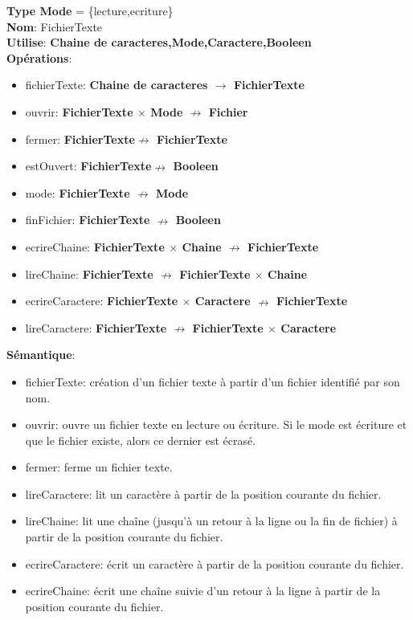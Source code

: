 \documentclass{article}
\begin{document}
    \noindent
    \textbf{Type Mode} = \{lecture,ecriture\} \\
    \textbf{Nom}: FichierTexte \\
    \textbf{Utilise}: \textbf{Chaine de caracteres,Mode,Caractere,Booleen} \\
    \textbf{Opérations}: \begin{itemize}[label=$\ $, leftmargin=2cm, itemsep=0cm]
        \item fichierTexte: \textbf{Chaine de caracteres $\rightarrow $ FichierTexte}
        \item ouvrir: \textbf{FichierTexte $ \times $ Mode $ \nrightarrow$ Fichier}
        \item fermer: \textbf{FichierTexte$  \nrightarrow $ FichierTexte}
        \item estOuvert: \textbf{FichierTexte$ \nrightarrow$  Booleen}
        \item mode: \textbf{FichierTexte $\nrightarrow $ Mode}
        \item finFichier: \textbf{FichierTexte $ \nrightarrow $ Booleen}
        \item ecrireChaine: \textbf{FichierTexte $ \times $ Chaine $ \nrightarrow$  FichierTexte}
        \item lireChaine: \textbf{FichierTexte $ \nrightarrow$  FichierTexte $ \times $ Chaine}
        \item ecrireCaractere: \textbf{FichierTexte $ \times $ Caractere $ \nrightarrow$  FichierTexte}
        \item lireCaractere: \textbf{FichierTexte $ \nrightarrow$  FichierTexte $ \times $ Caractere}
    \end{itemize}
    
    \textbf{Sémantique}: \begin{itemize}[label=$\- $, leftmargin=2cm, itemsep=0cm]
        \item fichierTexte: création d’un fichier texte à partir d’un fichier identifié par son nom.
        \item ouvrir: ouvre un fichier texte en lecture ou écriture. Si le mode est écriture et que le fichier existe, alors ce dernier est écrasé.
        \item fermer: ferme un fichier texte.
        \item lireCaractere: lit un caractère à partir de la position courante du fichier.
        \item lireChaine: lit une chaîne (jusqu'à un retour à la ligne ou la fin de fichier) à partir de la position courante du fichier.
        \item ecrireCaractere: écrit un caractère à partir de la position courante du fichier.
        \item ecrireChaine: écrit une chaîne suivie d'un retour à la ligne à partir de la position courante du fichier.
    \end{itemize}
\end{document}
